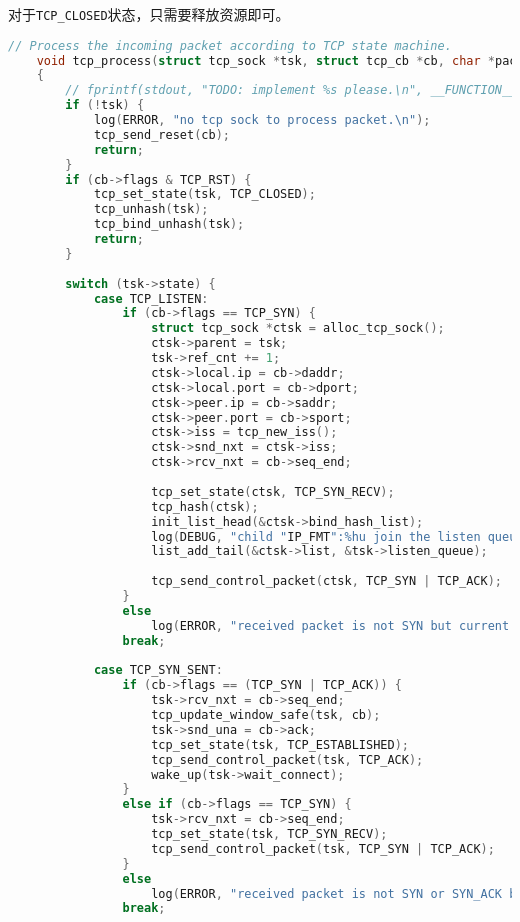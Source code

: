\documentclass[UTF8]{report}
\begin{document}
对于\texttt{TCP_CLOSED}状态，只需要释放资源即可。

\begin{lstlisting}[language=C]
    // Process the incoming packet according to TCP state machine. 
    void tcp_process(struct tcp_sock *tsk, struct tcp_cb *cb, char *packet)
    {
        // fprintf(stdout, "TODO: implement %s please.\n", __FUNCTION__);
        if (!tsk) {
            log(ERROR, "no tcp sock to process packet.\n");
            tcp_send_reset(cb);
            return;
        }
        if (cb->flags & TCP_RST) {
            tcp_set_state(tsk, TCP_CLOSED);
            tcp_unhash(tsk);
            tcp_bind_unhash(tsk);
            return;
        }
    
        switch (tsk->state) {
            case TCP_LISTEN:
                if (cb->flags == TCP_SYN) {
                    struct tcp_sock *ctsk = alloc_tcp_sock();
                    ctsk->parent = tsk;
                    tsk->ref_cnt += 1;
                    ctsk->local.ip = cb->daddr;
                    ctsk->local.port = cb->dport;
                    ctsk->peer.ip = cb->saddr;
                    ctsk->peer.port = cb->sport;
                    ctsk->iss = tcp_new_iss();
                    ctsk->snd_nxt = ctsk->iss;
                    ctsk->rcv_nxt = cb->seq_end;
    
                    tcp_set_state(ctsk, TCP_SYN_RECV);
                    tcp_hash(ctsk);
                    init_list_head(&ctsk->bind_hash_list);
                    log(DEBUG, "child "IP_FMT":%hu join the listen queue of parent "IP_FMT":%hu", HOST_IP_FMT_STR(ctsk->sk_sip), ntohs(ctsk->sk_sport), HOST_IP_FMT_STR(tsk->sk_sip), ntohs(tsk->sk_sport));
                    list_add_tail(&ctsk->list, &tsk->listen_queue);
    
                    tcp_send_control_packet(ctsk, TCP_SYN | TCP_ACK);
                }
                else
                    log(ERROR, "received packet is not SYN but current state is LISTEN, drop it.");
                break;
    
            case TCP_SYN_SENT:
                if (cb->flags == (TCP_SYN | TCP_ACK)) {
                    tsk->rcv_nxt = cb->seq_end;
                    tcp_update_window_safe(tsk, cb);
                    tsk->snd_una = cb->ack;
                    tcp_set_state(tsk, TCP_ESTABLISHED);
                    tcp_send_control_packet(tsk, TCP_ACK);
                    wake_up(tsk->wait_connect);
                }
                else if (cb->flags == TCP_SYN) {
                    tsk->rcv_nxt = cb->seq_end;
                    tcp_set_state(tsk, TCP_SYN_RECV);
                    tcp_send_control_packet(tsk, TCP_SYN | TCP_ACK);
                }
                else
                    log(ERROR, "received packet is not SYN or SYN_ACK but current state is SYN_SENT, drop it.");
                break;
    

\end{lstlisting}
\end{document}

